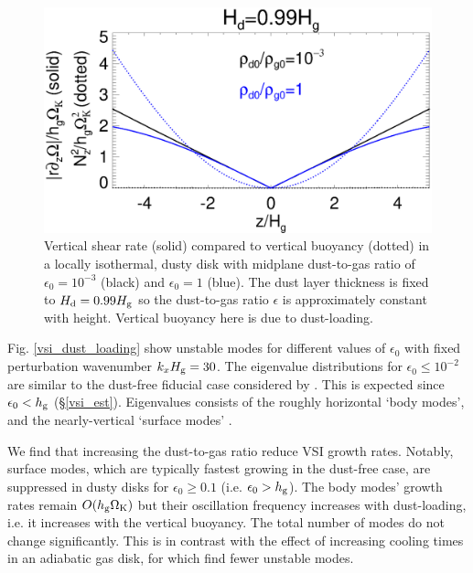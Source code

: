\begin{figure}
  \includegraphics[width=\linewidth]{figures/compare_vshear_Nz2_fixHd} 
  \caption{Vertical shear rate (solid) compared to vertical buoyancy
    (dotted) in a locally isothermal, dusty disk with midplane dust-to-gas ratio
    of $\epsilon_0=10^{-3}$ (black) and $\epsilon_0=1$ (blue). 
    The dust layer thickness is fixed to $H_\mathrm{d}=0.99H_\mathrm{g}$ so the 
    dust-to-gas ratio $\epsilon$ is approximately constant with
    height. Vertical buoyancy here is due to dust-loading. 
    \label{compare_vshear_fixHd}
    }
\end{figure}

Fig. \ref{vsi_dust_loading} show unstable modes for different values
of $\epsilon_0$ with fixed perturbation wavenumber  $k_xH_\mathrm{g} = 30$. The
eigenvalue distributions for $\epsilon_0 \leq 10^{-2}$ are similar to the
dust-free fiducial case considered by . This is
expected since $\epsilon_0 < h_\mathrm{g}$ (\S\ref{vsi_est}). Eigenvalues 
consists 
of the roughly horizontal `body modes', and the nearly-vertical
`surface modes' \citep[which are associated with the imposed vertical
boundaries, ][]{barker15}.   

We find that increasing the dust-to-gas ratio reduce VSI growth
rates. Notably, surface modes, which are typically fastest growing in
the dust-free case, are suppressed in dusty disks for $\epsilon_0\geq
0.1$ (i.e. $\epsilon_0> h_\mathrm{g}$).   
The body modes' growth rates remain $ O(h_\mathrm{g}\Omega_{\rm K})$ 
but their oscillation frequency increases with
dust-loading, i.e. it increases with the vertical buoyancy. 
The total number of modes do not change 
significantly. This is in contrast with the effect of increasing
cooling times in an adiabatic gas disk, for which 
find fewer unstable modes. 

